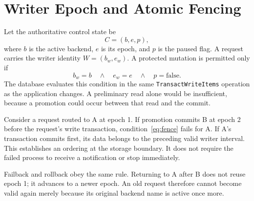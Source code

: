 \section{Writer Epoch and Atomic Fencing}
Let the authoritative control state be
\begin{equation}
C=(b,e,p),
\end{equation}
where $b$ is the active backend, $e$ is its epoch, and $p$ is the paused flag. A request carries the writer identity $W=(b_w,e_w)$. A protected mutation is permitted only if
\begin{equation}\label{eq:fence}
b_w=b\quad\land\quad e_w=e\quad\land\quad p=\mathrm{false}.
\end{equation}
The database evaluates this condition in the same \texttt{TransactWriteItems} operation as the application changes. A preliminary read alone would be insufficient, because a promotion could occur between that read and the commit.

Consider a request routed to A at epoch 1. If promotion commits B at epoch 2 before the request's write transaction, condition~\eqref{eq:fence} fails for A. If A's transaction commits first, its data belongs to the preceding valid writer interval. This establishes an ordering at the storage boundary. It does not require the failed process to receive a notification or stop immediately.

Failback and rollback obey the same rule. Returning to A after B does not reuse epoch 1; it advances to a newer epoch. An old request therefore cannot become valid again merely because its original backend name is active once more.

